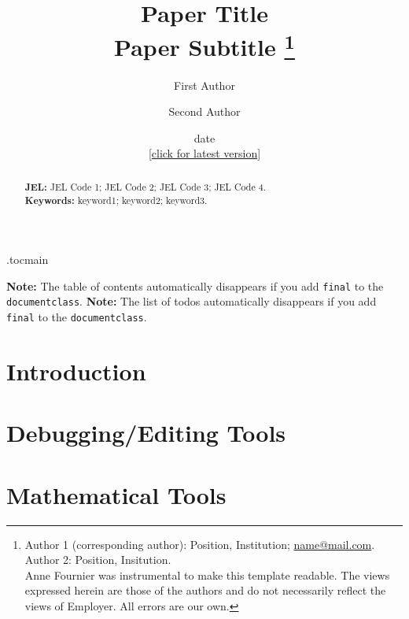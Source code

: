 \documentclass[11 pt]{article}
\title{Paper Title  \\
	Paper Subtitle%
\thanks{%
Author 1 (corresponding author): Position, Institution; \url{name@mail.com}. 
Author 2: Position, Insitution. \\[1ex]
\noindent
Anne Fournier was instrumental to make this template readable. The views expressed herein are those of the authors and do not necessarily reflect the views of Employer. All errors are our own.
}}
\author{%
	\large First Author  \and
	\large Second Author
	}
\date{
	date \\
	\small{[\href{https://github.com/diegojavierjimenez/paper}{click for latest version}]}
}
\begin{document}
\etocdepthtag.toc{main}


\maketitle
\thispagestyle{empty}
\vspace{-4ex}
\begin{abstract}



\vspace{4ex}
\noindent \textbf{JEL: }JEL Code 1; JEL Code 2; JEL Code 3; JEL Code 4. \\
\noindent \textbf{Keywords:} keyword1; keyword2; keyword3.
\end{abstract}
\newpage

\ifoptionfinal
{}%
{
\noindent
\textbf{Note:} The table of contents automatically disappears if you add \texttt{final} to the \texttt{documentclass}.
\tableofcontents
\thispagestyle{empty}
\newpage
\noindent
\textbf{Note:} The list of todos automatically disappears if you add \texttt{final} to the \texttt{documentclass}.
\listoftodos
\thispagestyle{empty}
\newpage
}




\setcounter{page}{1}


\section{Introduction}


\section{Debugging/Editing Tools}


\section{Mathematical Tools}


\newpage
\nocite{brown2021working}
\singlespacing



\newpage
{}

\end{document}
